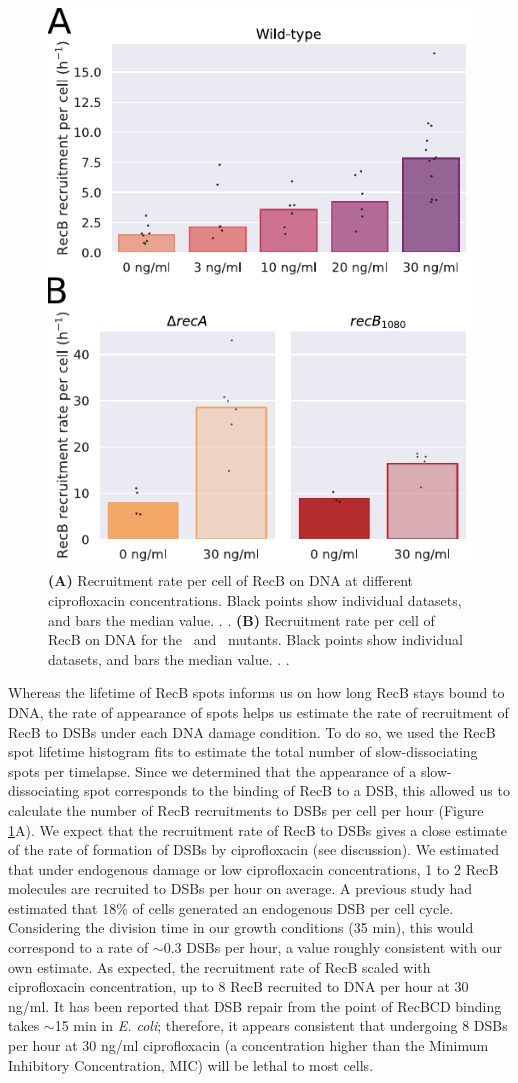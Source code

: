 \begin{figure}[htbp]
    \centering
    \includegraphics[width=.4\textwidth]{Figures/Fig3_RecB_recruitment.pdf}
    \caption{\textbf{(A)} Recruitment rate per cell of RecB on DNA at different ciprofloxacin concentrations. Black points show individual datasets, and bars the median value. . . \textbf{(B)} Recruitment rate per cell of RecB on DNA for the \dreca\ and \geneteneighty\ mutants. Black points show individual datasets, and bars the median value. . .}
    \label{Fig:recruitment}
\end{figure}

Whereas the lifetime of RecB spots informs us on how long RecB stays bound to DNA, the rate of appearance of spots helps us estimate the rate of recruitment of RecB to DSBs under each DNA damage condition. To do so, we used the RecB spot lifetime histogram fits to estimate the total number of slow-dissociating spots per timelapse. Since we determined that the appearance of a slow-dissociating spot corresponds to the binding of RecB to a DSB, this allowed us to calculate the number of RecB recruitments to DSBs per cell per hour (Figure \ref{Fig:recruitment}A). We expect that the recruitment rate of RecB to DSBs gives a close estimate of the rate of formation of DSBs by ciprofloxacin (see discussion). We estimated that under endogenous damage or low ciprofloxacin concentrations, 1 to 2 RecB molecules are recruited to DSBs per hour on average. A previous study had estimated that 18\% of cells generated an endogenous DSB per cell cycle\cite{Sinha2018}. Considering the division time in our growth conditions (35 min), this would correspond to a rate of $\sim$0.3 DSBs per hour, a value roughly consistent with our own estimate. As expected, the recruitment rate of RecB scaled with ciprofloxacin concentration, up to 8 RecB recruited to DNA per hour at 30 ng/ml. It has been reported that DSB repair from the point of RecBCD binding takes $\sim$15 min in \emph{E. coli}\cite{Wiktor2021}; therefore, it appears consistent that undergoing 8 DSBs per hour at 30 ng/ml ciprofloxacin (a concentration higher than the Minimum Inhibitory Concentration, MIC) will be lethal to most cells.

